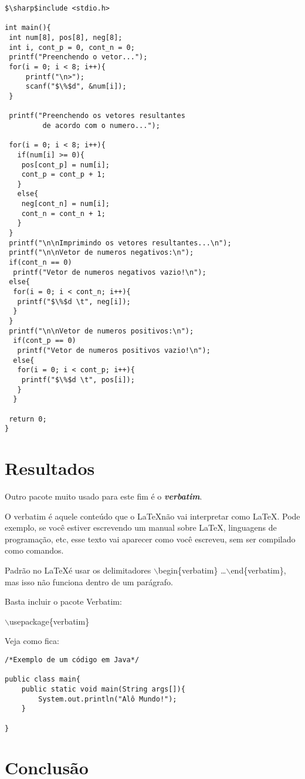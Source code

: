 \documentclass{article}
\begin{document}
\begin{lstlisting}
$\sharp$include <stdio.h>

int main(){
 int num[8], pos[8], neg[8];
 int i, cont_p = 0, cont_n = 0;
 printf("Preenchendo o vetor...");
 for(i = 0; i < 8; i++){
     printf("\n>");
     scanf("$\%$d", &num[i]);
 }

 printf("Preenchendo os vetores resultantes 
         de acordo com o numero...");

 for(i = 0; i < 8; i++){
   if(num[i] >= 0){
    pos[cont_p] = num[i];
    cont_p = cont_p + 1;
   }
   else{
    neg[cont_n] = num[i];
    cont_n = cont_n + 1;
   }
 }
 printf("\n\nImprimindo os vetores resultantes...\n");
 printf("\n\nVetor de numeros negativos:\n");
 if(cont_n == 0)
  printf("Vetor de numeros negativos vazio!\n");
 else{
  for(i = 0; i < cont_n; i++){
   printf("$\%$d \t", neg[i]);
  }
 }
 printf("\n\nVetor de numeros positivos:\n");
  if(cont_p == 0)
   printf("Vetor de numeros positivos vazio!\n");
  else{
   for(i = 0; i < cont_p; i++){
    printf("$\%$d \t", pos[i]);
   }
  }

 return 0;
}

\end{lstlisting}

\section{Resultados}
Outro pacote muito usado para este fim é o \emph{\textbf{verbatim}}.

O verbatim é aquele conteúdo que o \LaTeX não vai interpretar como \LaTeX. Pode exemplo, se você estiver escrevendo um manual sobre \LaTeX, linguagens de programação, etc, esse texto vai aparecer como você escreveu, sem ser compilado como comandos.

Padrão no \LaTeX é usar os delimitadores $\backslash$begin\{verbatim\} \dots $\backslash$end\{verbatim\}, mas isso não funciona dentro de um parágrafo.

Basta incluir o pacote Verbatim:

$\backslash$usepackage\{verbatim\}

Veja como fica:

\begin{verbatim}
/*Exemplo de um código em Java*/

public class main{
    public static void main(String args[]){
        System.out.println("Alô Mundo!");
    }

}
\end{verbatim}

\section{Conclusão}
\lipsum[1-2]


\end{document}
